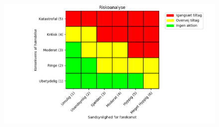 \documentclass{article}
\begin{document}
\begin{figure}[ht]
  \begin{center}
    \includegraphics[width=\textwidth]{figures/risk_analyse.png}
  \end{center}
\end{figure}
\end{document}
